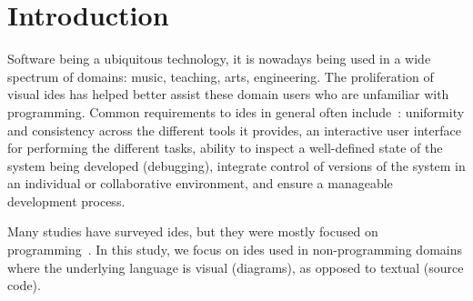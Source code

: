 \section{Introduction} \label{sec:introduction}

Software being a ubiquitous technology, it is nowadays being used in a wide spectrum of domains: music, teaching, arts, engineering.
The proliferation of visual \acfp{ide} has helped better assist these domain users who are unfamiliar with programming.
Common requirements to \acp{ide} in general often include~\cite{habermann1986}: uniformity and consistency across the different tools it provides, an interactive user interface for performing the different tasks, ability to inspect a well-defined state of the system being developed (\eg debugging), integrate control of versions of the system in an individual or collaborative environment, and ensure a manageable development process.

Many studies have surveyed \acp{ide}, but they were mostly focused on programming~\cite{}\es{}.
In this study, we focus on \acp{ide} used in non-programming domains where the underlying language is visual (\eg diagrams), as opposed to textual (\eg source code).


